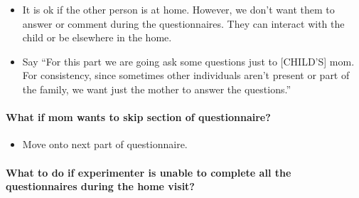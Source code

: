 \documentclass[
  12pt,
]{book}
\providecommand{\tightlist}{%
  \setlength{\itemsep}{0pt}\setlength{\parskip}{0pt}}
\begin{document}
\begin{itemize}
\tightlist
\item
  It is ok if the other person is at home. However, we don't want them to answer or comment during the questionnaires. They can interact with the child or be elsewhere in the home.
\item
  Say ``For this part we are going ask some questions just to {[}CHILD'S{]} mom. For consistency, since sometimes other individuals aren't present or part of the family, we want just the mother to answer the questions.''
\end{itemize}

\hypertarget{what-if-mom-wants-to-skip-section-of-questionnaire}{%
\paragraph*{What if mom wants to skip section of questionnaire?}\label{what-if-mom-wants-to-skip-section-of-questionnaire}}

\begin{itemize}
\tightlist
\item
  Move onto next part of questionnaire.
\end{itemize}

\hypertarget{what-to-do-if-experimenter-is-unable-to-complete-all-the-questionnaires-during-the-home-visit}{%
\paragraph*{What to do if experimenter is unable to complete all the questionnaires during the home visit?}\label{what-to-do-if-experimenter-is-unable-to-complete-all-the-questionnaires-during-the-home-visit}}
\end{document}
